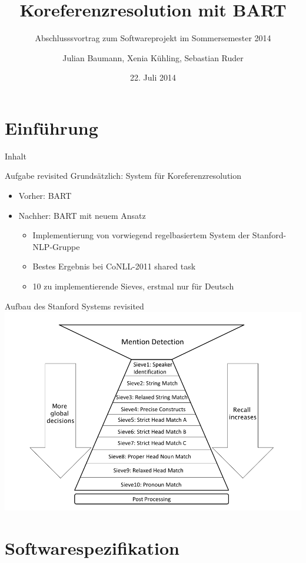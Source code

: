 \documentclass[11pt,a4paper]{beamer}
\author{Julian Baumann, Xenia Kühling, Sebastian Ruder}
\title{Koreferenzresolution mit BART}
\subtitle{Abschlusssvortrag zum Softwareprojekt im Sommersemester 2014}
\date{22. Juli 2014}
\begin{document}
\maketitle

\section{Einführung}
\begin{frame}{Inhalt}
\tableofcontents
\end{frame}

\begin{frame}{Aufgabe revisited}
Grundsätzlich: System für Koreferenzresolution
\begin{itemize}
\item Vorher: BART
\item Nachher: BART mit neuem Ansatz
\begin{itemize}
\item Implementierung von vorwiegend regelbasiertem System der Stanford-NLP-Gruppe
\item Bestes Ergebnis bei CoNLL-2011 shared task
\item 10 zu implementierende Sieves, erstmal nur für Deutsch
\end{itemize}
\end{itemize}
\end{frame}


\begin{frame}{Aufbau des Stanford Systems revisited}
\includegraphics[scale=0.29]{stanford.png}
\end{frame}


\section{Softwarespezifikation}
\end{document}
